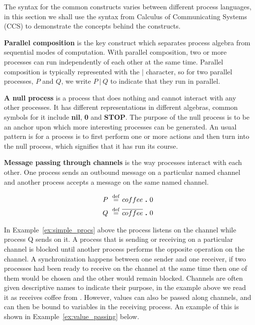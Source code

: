 	The syntax for the common constructs varies between different process 
	languages, in this section we shall use the syntax from Calculus of 
	Communicating Systems (CCS) to demonstrate the concepts behind the constructs.
	
	\textbf{Parallel composition} is the key construct which separates process 
	algebra from sequential modes of computation. With parallel composition, two 
	or more processes can run independently of each other at the same time. 
	Parallel composition is typically represented with the $|$ character, so for 
	two parallel processes, $P$ and $Q$, we write $P\ |\ Q$ to indicate that 
	they run in parallel.

	\textbf{A null process} is a process that does nothing and cannot interact 
	with any other processes. It has different representations in different 
	algebras, common symbols for it include \textbf{nil}, \textbf{0} and 
	\textbf{STOP}. The purpose of the null process is to be an anchor upon which 
	more interesting processes can be generated. An usual pattern is for a 
	process is to first perform one or more actions and then turn into the null 
	process, which signifies that it has run its course.
	
	\textbf{Message passing through channels} is the way processes interact with 
	each other. One process sends an outbound message on a particular named 
	channel and another process accepts a message on the same named channel. 

	\begin{Exa}
	\label{ex:simple_procs}
	\begin{align*}
			P \ \stackrel{\mathrm{def}}{=}\  & coffee \ \textbf{.}\  0 \\
			Q \ \stackrel{\mathrm{def}}{=}\  & \overline{coffee} \ \textbf{.}\  0 
	\end{align*}	
	\end{Exa}
				
	In Example~\ref{ex:simple_procs} above the process  listens on the  channel while 
	process Q sends on it. A process that is sending or receiving on a 
	particular channel is blocked until another process performs the opposite 
	operation on the channel. A synchronization happens between one sender and 
	one receiver, if two processes had been ready to receive on the 
	 channel at the same time then one of them would be chosen 
	and the other would remain blocked. Channels are often given descriptive 
	names to indicate their purpose, in the example above we read it as  
	receives coffee from . However, values can also be passed along channels, 
	and can then be bound to variables in the receiving process. An example of 
	this is shown in Example~\ref{ex:value_passing} below.
	
